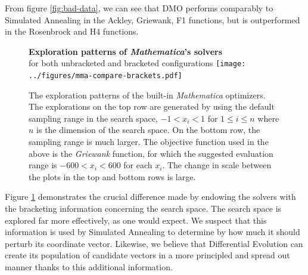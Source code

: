 \documentclass[12pt]{article}
\begin{document}
From figure \ref{fig:bad-data}, we can see that DMO performs comparably to
Simulated Annealing in the Ackley, Griewank, F1 functions, but is
outperformed in the Rosenbrock and H4 functions.

\begin{figure}[H]
    \begin{center}
        {\large {\bfseries Exploration patterns of \emph{Mathematica}'s solvers}\\
        for both unbracketed and bracketed configurations}
        \texttt{[image: ../figures/mma-compare-brackets.pdf]}
        \caption{The exploration patterns of the built-in
        \emph{Mathematica} optimizers. The explorations on the top row are
            generated by using the default sampling range in the search
            space, $-1 < x_i < 1$ for $1 \leq i \leq n$ where $n$ is the
            dimension of the search space. On the bottom row, the sampling
            range is much larger. The objective function used in the above
            is the \emph{Griewank} function, for which the suggested
            evaluation range is $-600 < x_i < 600$ for each
            $x_i$\cite{griewank1981}. The change in scale between the plots
            in the top and bottom rows is large. %
        }
        \label{fig:exploration}
    \end{center}
\end{figure}

Figure \ref{fig:exploration} demonstrates the crucial difference made by
endowing the solvers with the bracketing information concerning the search
space. The search space is explored far more effectively, as one would
expect. We suspect that this information is used by Simulated Annealing to
determine by how much it should perturb its coordinate vector. Likewise, we
believe that Differential Evolution can create its population of candidate
vectors in a more principled and spread out manner thanks to this
additional information.
\end{document}
